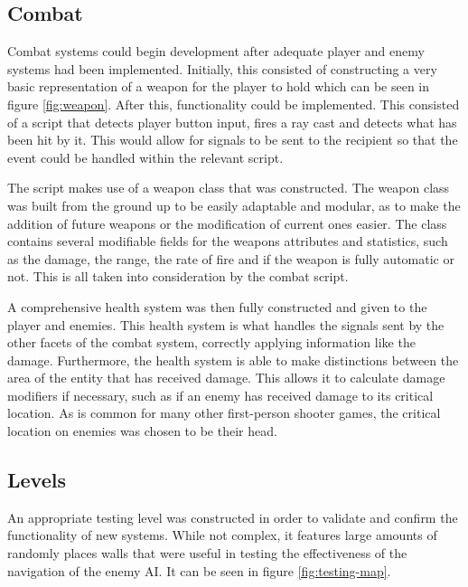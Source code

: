 \documentclass[11pt]{article}
\begin{document}
\subsection{Combat}
Combat systems could begin development after adequate player and enemy systems had been
implemented. Initially, this consisted of constructing a very basic representation of a weapon for
the player to hold which can be seen in figure \ref{fig:weapon}. After this, functionality could be
implemented. This consisted of a script that detects player button input, fires a ray cast and
detects what has been hit by it. This would allow for signals to be sent to the recipient so that
the event could be handled within the relevant script. 

The script makes use of a weapon class that was constructed. The weapon class was built from the
ground up to be easily adaptable and modular, as to make the addition of future weapons or the
modification of current ones easier. The class contains several modifiable fields for the weapons
attributes and statistics, such as the damage, the range, the rate of fire and if the weapon is
fully automatic or not. This is all taken into consideration by the combat script.

A comprehensive health system was then fully constructed and given to the player and enemies. This
health system is what handles the signals sent by the other facets of the combat system, correctly
applying information like the damage. Furthermore, the health system is able to make distinctions
between the area of the entity that has received damage. This allows it to calculate damage
modifiers if necessary, such as if an enemy has received damage to its critical location. As is
common for many other first-person shooter games, the critical location on enemies was chosen to be
their head. \\

\subsection{Levels}
An appropriate testing level was constructed in order to validate and confirm the functionality of
new systems. While not complex, it features large amounts of randomly places walls that were useful
in testing the effectiveness of the navigation of the enemy AI. It can be seen in figure \ref{fig:testing-map}.
\end{document}

